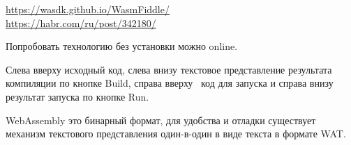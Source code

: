 
\noindent
\url{https://wasdk.github.io/WasmFiddle/}\\
\url{https://habr.com/ru/post/342180/}
\bigskip

Попробовать технологию без установки можно online.

\bigskip
{}

Слева вверху исходный код, слева внизу текстовое представление результата
компиляции по кнопке Build, справа вверху \js\ код для запуска и справа
внизу результат запуска по кнопке Run.

WebAssembly это бинарный формат, для удобства и отладки существует механизм
текстового представления один-в-один в виде текста в формате WAT.

